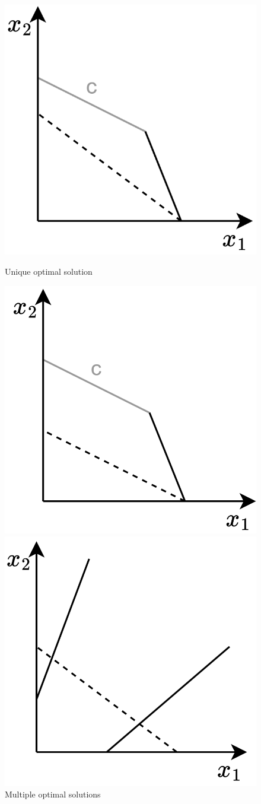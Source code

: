 \begin{figure}[H] 
    \begin{minipage}[b]{0.5\linewidth}
      \centering
      \includegraphics[width=.5\linewidth]{images/un.png} 
      \caption*{Unique optimal solution} 
      \vspace{4ex}
    \end{minipage}%
    \begin{minipage}[b]{0.5\linewidth}
      \centering
      \includegraphics[width=.5\linewidth]{images/mul.png} 
      \caption*{Multiple optimal solutions} 
      \vspace{4ex}
    \end{minipage} 
    \begin{minipage}[b]{0.5\linewidth}
      \centering
      \includegraphics[width=.5\linewidth]{images/unb.png} 

\end{minipage}
\end{figure}
